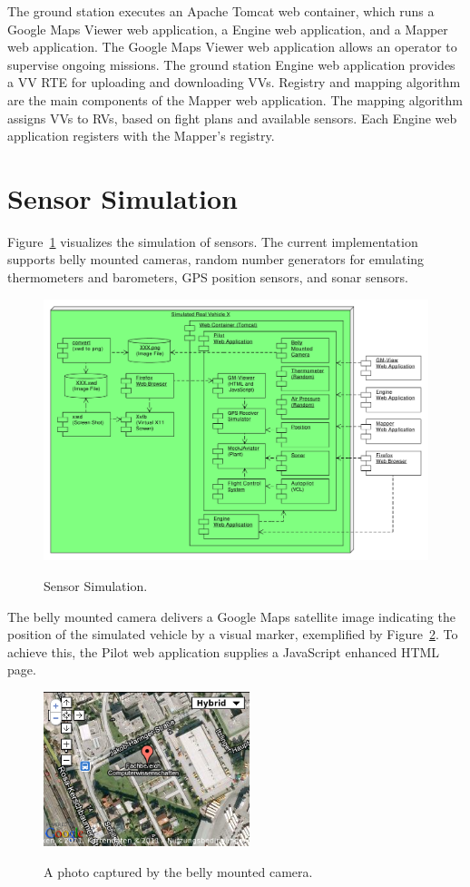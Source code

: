 The ground station executes an Apache Tomcat web container, which runs a Google Maps Viewer
web application, a Engine web application, and a Mapper web application.
%
The Google Maps Viewer web application allows an operator to supervise ongoing missions.
%
The ground station Engine web application provides a \ac{VV RTE} for uploading and downloading \acp{VV}. 
%
Registry and mapping algorithm are the main components of the Mapper web application.
The mapping algorithm assigns \acp{VV} to \acp{RV}, based on fight plans and available sensors.
%
Each Engine web application registers with the Mapper's registry.


\section{Sensor Simulation}
Figure~\ref{fig:SensorSimulation} visualizes the simulation of sensors.
%
The current implementation supports belly mounted cameras, random number generators for emulating thermometers and
barometers, GPS position sensors, and sonar sensors.

 
\begin{figure}[h]
	\begin{center}
		{\includegraphics[width=11.6cm]{SensorSimulation-3.pdf}}
	\end{center}
	\caption{Sensor Simulation.\label{fig:SensorSimulation}}
\end{figure}


The belly mounted camera delivers a Google Maps satellite image indicating the position of the simulated vehicle by a
visual marker, exemplified by Figure~\ref{fig:BellyMountedCamera}.
To achieve this, the Pilot web application supplies a JavaScript enhanced HTML page.
\begin{figure}[h]
	\begin{center}
		{\includegraphics[width=6cm]{bmc-photo-cosy.png}}
	\end{center}
	\caption{A photo captured by the belly mounted camera.\label{fig:BellyMountedCamera}}
\end{figure}

